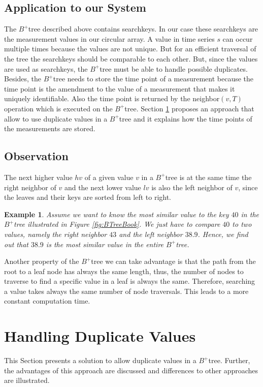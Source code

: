 \documentclass[abstracton,12pt]{scrreprt}
\newtheorem{example}{Example}
\begin{document}
\subsection{Application to our System}
The $B^+$tree described above contains searchkeys. In our case these searchkeys are the measurement values in our circular array. A value in time series $s$ can occur multiple times because the values are not unique. But for an efficient traversal of the tree the searchkeys should be comparable to each other. But, since the values are used as searchkeys, the $B^+$tree must be able to handle possible duplicates. Besides, the $B^+$tree needs to store the time point of a measurement because the time point is the amendment to the value of a measurement that makes it uniquely identifiable. Also the time point  is returned by the neighbor$(v,T)$ operation which is executed on the $B^+$tree. Section \ref{sec:allowDV} proposes an approach that allow to use duplicate values in a $B^+$tree and it explains how the time points of the measurements are stored. 

\subsection{Observation}
The next higher value $hv$ of a given value $v$ in a $B^+$tree is at the same time the right neighbor of $v$ and the next lower value $lv$ is also the left neighbor of $v$, since the leaves and their keys are sorted from left to right.
\begin{example}
	Assume we want to know the most similar value to the key $40$ in the $B^+$tree illustrated in Figure \ref{fig:BTreeBook}. We just have to compare $40$ to two values, namely the right neighbor $43$ and the left neighbor $38.9$. Hence, we find out that $38.9$ is the most similar value in the entire $B^+$tree. 
\end{example}
Another property of the $B^+$tree we can take advantage is that the path from the root to a leaf node has always the same length, thus, the number of nodes to traverse to find a specific value in a leaf is always the same. Therefore, searching a value takes always the same number of node traversals. This leads to a more constant computation time. 


\section{Handling Duplicate Values}
\label{sec:allowDV}
This Section presents a solution to allow duplicate values in a $B^+$tree. Further, the advantages of this approach are discussed and differences to other approaches are illustrated. 
\end{document}
